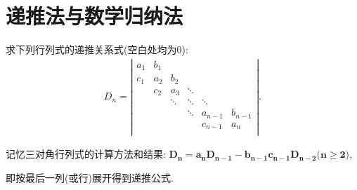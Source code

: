 \documentclass[../../main.tex]{subfiles}
\begin{document}
\section{递推法与数学归纳法}

\begin{proposition}\label{三对角行列式}
求下列行列式的递推关系式(空白处均为0):
\begin{equation}
\begin{split}
D_n=\left| \begin{matrix}
a_1&		b_1&		&		&		&		\\
c_1&		a_2&		b_2&		&		&		\\
&		c_2&		a_3&		\ddots&		&		\\
&		&		\ddots&		\ddots&		\ddots&		\\
&		&		&		\ddots&		a_{n-1}&		b_{n-1}\\
&		&		&		&		c_{n-1}&		a_n\\
\end{matrix} \right|.
\end{split}
\nonumber
\end{equation}
\end{proposition}
\begin{note}
记忆三对角行列式的计算方法和结果:
$\boldsymbol{D}_{\boldsymbol{n}}=\boldsymbol{a}_{\boldsymbol{n}}\boldsymbol{D}_{\boldsymbol{n}-\boldsymbol{1}}-\boldsymbol{b}_{\boldsymbol{n}-\boldsymbol{1}}\boldsymbol{c}_{\boldsymbol{n}-\boldsymbol{1}}\boldsymbol{D}_{\boldsymbol{n}-\boldsymbol{2}}\boldsymbol{(n}\ge \boldsymbol{2)}$,

即按最后一列(或行)展开得到递推公式.
\end{note}
\end{document}
